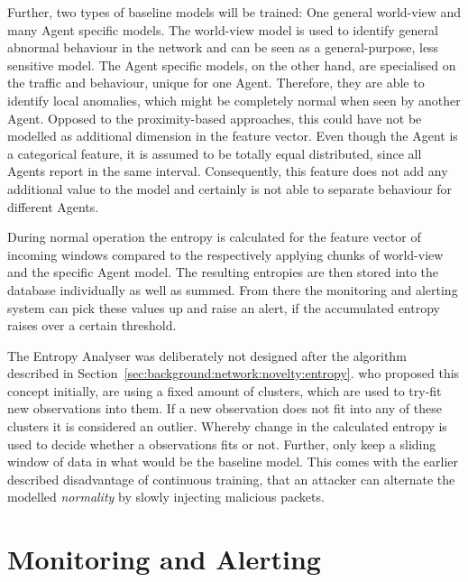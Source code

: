 Further, two types of baseline models will be trained: One general world-view and many Agent specific models.
The world-view model is used to identify general abnormal behaviour in the network and can be seen as a general-purpose, less sensitive model.
The Agent specific models, on the other hand, are specialised on the traffic and behaviour, unique for one Agent. Therefore, they are able to identify local anomalies, which might be completely normal when seen by another Agent.
Opposed to the proximity-based approaches, this could have not be modelled as additional dimension in the feature vector.
Even though the Agent is a categorical feature, it is assumed to be totally equal distributed, since all Agents report in the same interval.
Consequently, this feature does not add any additional value to the model and certainly is not able to separate behaviour for different Agents.

During normal operation the entropy is calculated for the feature vector of incoming windows compared to the respectively applying chunks of world-view and the specific Agent model.
The resulting entropies are then stored into the database individually as well as summed. From there the monitoring and alerting system can pick these values up and raise an alert, if the accumulated entropy raises over a certain threshold.

The Entropy Analyser was deliberately not designed after the algorithm described in Section~\ref{sec:background:network:novelty:entropy}.
\textcite{Toshniwal2014} who proposed this concept initially, are using a fixed amount of clusters, which are used to try-fit new observations into them. If a new observation does not fit into any of these clusters it is considered an outlier. Whereby change in the calculated entropy is used to decide whether a observations fits or not.
Further, \textcite{Toshniwal2014} only keep a sliding window of data in what would be the baseline model. This comes with the earlier described disadvantage of continuous training, that an attacker can alternate the modelled \emph{normality} by slowly injecting malicious packets.

\section{Monitoring and Alerting}
\label{sec:concept:mon}

